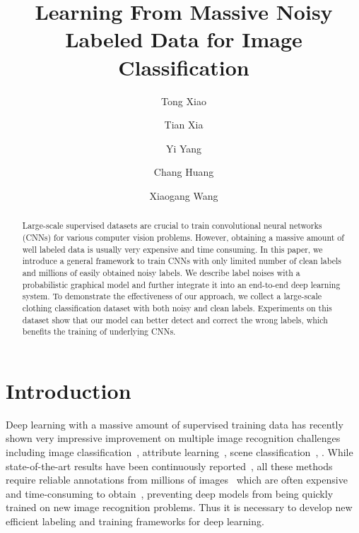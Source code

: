 \documentclass[10pt,twocolumn,letterpaper]{article}
\begin{document}

\title{Learning From Massive Noisy Labeled Data for Image Classification}

\author[1]{Tong Xiao}
\author[2]{Tian Xia}
\author[2]{Yi Yang}
\author[2]{Chang Huang}
\author[1]{Xiaogang Wang}


\renewcommand\Authands{, and }


\maketitle

\begin{abstract}
Large-scale supervised datasets are crucial to train convolutional neural networks (CNNs) for various computer vision problems. However, obtaining a massive amount of well labeled data is usually very expensive and time consuming. In this paper, we introduce a general framework to train CNNs with only limited number of clean labels and millions of easily obtained noisy labels. We describe label noises with a probabilistic graphical model and further integrate it into an end-to-end deep learning system. To demonstrate the effectiveness of our approach, we collect a large-scale clothing classification dataset with both noisy and clean labels. Experiments on this dataset show that our model can better detect and correct the wrong labels, which benefits the training of underlying CNNs.
\end{abstract}

\section{Introduction} %
\label{sec:introduction}

Deep learning with a massive amount of supervised training data has recently shown very impressive improvement on multiple image recognition challenges including image classification~\cite{krizhevsky2012imagenet}, attribute learning~\cite{zhang2013panda}, scene classification~\cite{farabet2013learning}, \etc. While state-of-the-art results have been continuously reported~\cite{zeiler2013visualizing,simonyan2014very,szegedy2014going}, all these methods require reliable annotations from millions of images~\cite{deng2009imagenet} which are often expensive and time-consuming to obtain~\cite{deng2009imagenet}, preventing deep models from being quickly trained on new image recognition problems. Thus it is necessary to develop new efficient labeling and training frameworks for deep learning.
\end{document}
